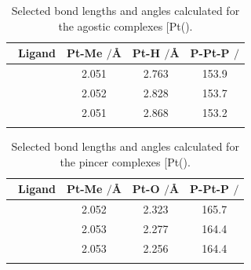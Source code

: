 \begin{table}[htp]
\caption[Selected bond lengths and angles calculated for [Pt(\tBuxantphos)\ce{Me{]}+}]{Selected bond lengths and angles calculated for the agostic complexes [Pt(\tBuxantphos)\ce{Me]+}.}
\vspace{1em}
\label{table:PtMeagostic}
\small
\begin{center}
\begin{tabular}{l c c c}
	\toprule
	~\bfseries{Ligand} & \bfseries{Pt-Me $/$\si{\angstrom}} & \bfseries{Pt-H $/$\si{\angstrom}}& \bfseries{P-Pt-P $/$\degrees{}} \\
	\midrule		
	~\tBuSixantphos	& 2.051	& 2.763 	& 153.9	\\
	~\tBuThixantphos	& 2.052	& 2.828 	& 153.7 	\\
	~\tBuXantphos{}	& 2.051	& 2.868	& 153.2	\\ 
	\bottomrule{}
\end{tabular}
\end{center}
\end{table}

\begin{table}[htp]
\caption[Selected bond lengths and angles calculated for [Pt(\tBuxantphosk)\ce{Me{]}+}]{Selected bond lengths and angles calculated for the pincer complexes [Pt(\tBuxantphosk)\ce{Me]+}.}
\vspace{1em}
\label{table:PtMepincer}
\small
\begin{center}
\begin{tabular}{l c c c}
	\toprule
	~\bfseries{Ligand} & \bfseries{Pt-Me $/$\si{\angstrom}} & \bfseries{Pt-O $/$\si{\angstrom}} & \bfseries{P-Pt-P $/$\degrees{}} \\
	\midrule		
	~\tBuSixantphos	& 2.052	& 2.323 	& 165.7 \\
	~\tBuThixantphos	& 2.053	& 2.277	& 164.4 \\
	~\tBuXantphos{}	& 2.053	& 2.256	& 164.4 \\ 
	\bottomrule{}
\end{tabular}
\end{center}
\end{table}

